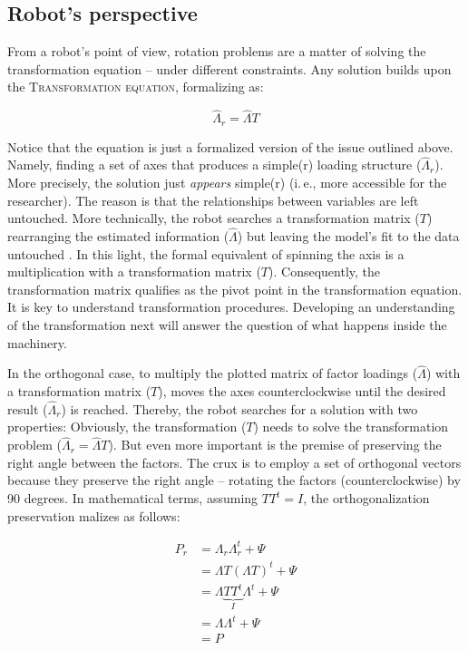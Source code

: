 \documentclass[jou, 11pt]{apa7}
\begin{document}
\subsection{Robot’s perspective}

From a robot’s point of view, rotation problems are a matter of solving the
transformation equation -- under different constraints. Any solution builds
upon the \textsc{Transformation equation}, formalizing as:

\begin{equation}
\hat{\Lambda}_r = \hat{\Lambda} {T}
\end{equation}

Notice that the equation is just a formalized version of the issue outlined
above. Namely, finding a set of axes that produces a simple(r) loading
structure ($\hat{\Lambda}_r$). More precisely, the solution just
\textit{appears} simple(r) (i.\,e., more accessible for the researcher). The
reason is that the relationships between variables are left untouched. More
technically, the robot searches a transformation matrix (${T}$) rearranging the
estimated information ($\hat{\Lambda}$) but leaving the model’s fit to the data
untouched \parencite{Mair2018}. In this light, the formal equivalent of
spinning the axis is a multiplication with a transformation matrix (${T}$).
Consequently, the transformation matrix qualifies as the pivot point in the
transformation equation. It is key to understand transformation procedures.
Developing an understanding of the transformation next will answer the question
of what happens inside the machinery.

In the orthogonal case, to multiply the plotted matrix of factor loadings
($\hat{\Lambda}$) with a transformation matrix ($T$), moves the axes
counterclockwise until the desired result ($\hat{\Lambda}_r$) is reached.
Thereby, the robot searches for a solution with two properties: Obviously, the
transformation ($T$) needs to solve the transformation problem
($\hat{\Lambda}_r = \hat{\Lambda} {T}$). But even more important is the premise
of preserving the right angle between the factors. The crux is to employ a set
of orthogonal vectors because they preserve the right angle -- rotating the
factors (counterclockwise) by 90 degrees. In mathematical terms, assuming
$TT^t=I$, the orthogonalization preservation malizes as follows:

\begin{equation}
\begin{split}
  P_r & = \Lambda_r\Lambda_r^t + \Psi\\
  & = \Lambda T (\Lambda T)^t + \Psi \\ 
  & = \Lambda\underbrace{T T^t}_{I} \Lambda^t + \Psi \\
  & = \Lambda\Lambda^t + \Psi  \\ 
  & = P
\end{split}
\end{equation}
\end{document}
